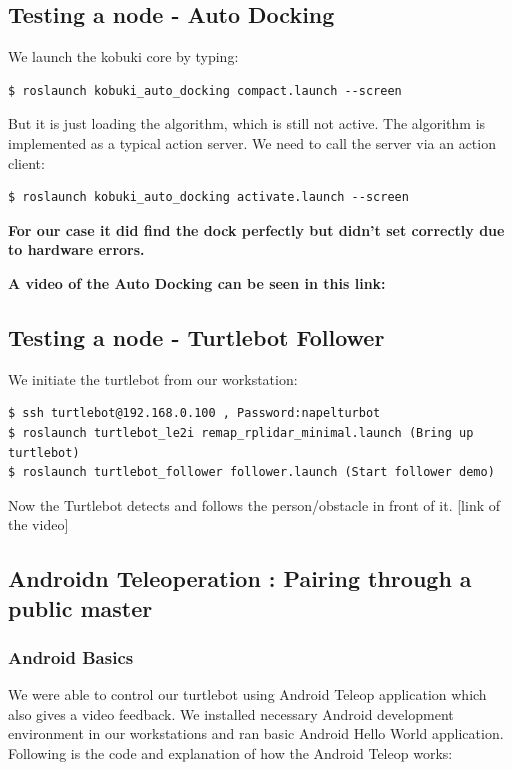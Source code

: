 \documentclass[10pt,a4paper]{article}
\begin{document}
\subsection{Testing a node - Auto Docking}
We launch the kobuki core by typing:

\begin{lstlisting}[frame=single] 
$ roslaunch kobuki_auto_docking compact.launch --screen
\end{lstlisting}
But it is just loading the algorithm, which is still not active. The algorithm is implemented as a typical action server. We need to call the server via an action client:

\begin{lstlisting}[frame=single] 
$ roslaunch kobuki_auto_docking activate.launch --screen
\end{lstlisting}

\textbf{For our case it did find the dock perfectly but didn't set correctly due to hardware errors.}

\textbf{A video of the Auto Docking can be seen in this link:}\\

\subsection{Testing a node - Turtlebot Follower}
We initiate the turtlebot from our workstation:
\begin{lstlisting}[frame=single]
$ ssh turtlebot@192.168.0.100 , Password:napelturbot
$ roslaunch turtlebot_le2i remap_rplidar_minimal.launch (Bring up turtlebot)
$ roslaunch turtlebot_follower follower.launch (Start follower demo)
\end{lstlisting}
Now the Turtlebot detects and follows the person/obstacle in front of it.
[link of the video]

\subsection{Androidn Teleoperation : Pairing through a public master}

\subsubsection{Android Basics}
We were able to control our turtlebot using Android Teleop application which also gives a video feedback.
We installed necessary Android development environment in our workstations and ran basic Android Hello World application. 
Following is the code and explanation of how the Android Teleop works:
\end{document}
